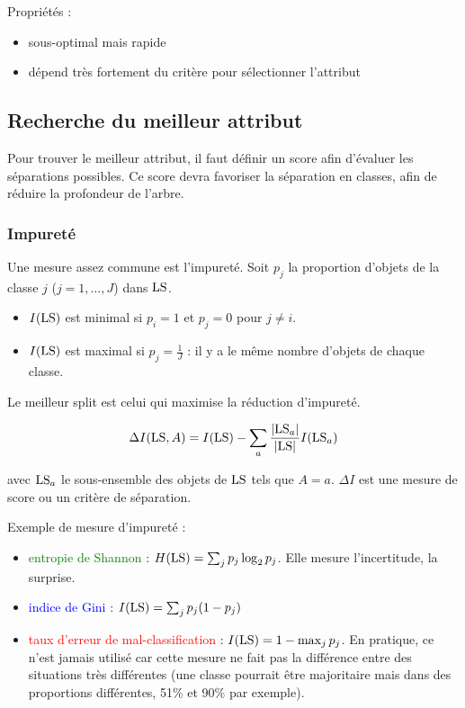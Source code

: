 	Propriétés : 
	
	\begin{itemize}
		\item sous-optimal mais rapide
		\item dépend très fortement du critère pour sélectionner l'attribut
	\end{itemize}
	
	\subsection{Recherche du meilleur attribut}
	
	Pour trouver le meilleur attribut, il faut définir un score afin d'évaluer les séparations possibles. Ce score devra favoriser la séparation en classes, afin de réduire la profondeur de l'arbre.
	
	
		\subsubsection{Impureté}
		
		Une mesure assez commune est l'impureté. Soit $p_j$ la proportion d'objets de la classe $j$ ($j = 1, \dots , J$) dans $\text{LS}$.
		
		\begin{itemize}
			\item $I(\text{LS})$ est minimal si $p_i = 1$ et $p_j = 0$ pour $j \neq i$.
			\item $I(\text{LS})$ est maximal si $p_j = \frac{1}{J}$ : il y a le même nombre d'objets de chaque classe.
		\end{itemize}
		
		Le meilleur split est celui qui maximise la réduction d'impureté.
		
		$$\Delta I(\text{LS}, A) = I(\text{LS}) - \sum_a \frac{\vert \text{LS}_a \vert}{\vert \text{LS} \vert} I(\text{LS}_a)$$
		
		avec $\text{LS}_a$ le sous-ensemble des objets de $\text{LS}$ tels que $A = a$. $\Delta I$ est une mesure de score ou un critère de séparation.
		
		
		
		Exemple de mesure d'impureté :
		
		\begin{itemize}
			\item \textcolor{green}{entropie de Shannon} : $H(\text{LS}) = \sum_j p_j \log_2 p_j$. Elle mesure l'incertitude, la surprise.
			
			\item \textcolor{blue}{indice de Gini} : $I(\text{LS}) = \sum_j p_j(1 - p_j)$
			\item \textcolor{red}{taux d'erreur de mal-classification} : $I(\text{LS}) = 1 - \max_j p_j$. En pratique, ce n'est jamais utilisé car cette mesure ne fait pas la différence entre des situations très différentes (une classe pourrait être majoritaire mais dans des proportions différentes, 51\% et 90\% par exemple).
			
		\end{itemize}
		

